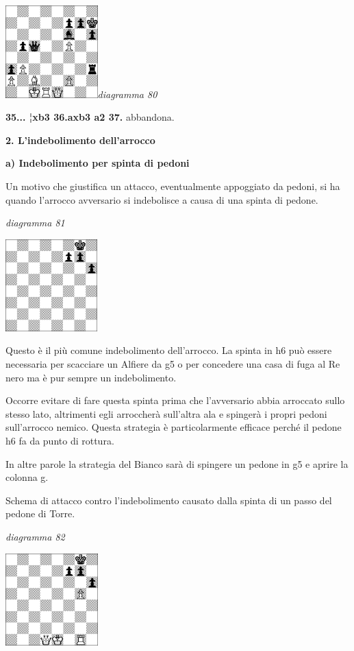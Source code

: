 \documentclass[
]{article}
\begin{document}
\includegraphics[width=1.40139in,height=1.40139in]{vertopal_109f12be458a423d8f3cc838880eaea2/media/image80.png}\emph{diagramma
80}

\textbf{35... ¦xb3 36.axb3 a2 37.} abbandona.

\textbf{2. L'indebolimento dell'arrocco}

\textbf{a) Indebolimento per spinta di pedoni}

Un motivo che giustifica un attacco, eventualmente appoggiato da pedoni,
si ha quando l'arrocco avversario si indebolisce a causa di una spinta
di pedone.

\emph{diagramma 81}

\includegraphics[width=1.39792in,height=1.39792in]{vertopal_109f12be458a423d8f3cc838880eaea2/media/image81.png}

Questo è il più comune indebolimento dell'arrocco. La spinta in h6 può
essere necessaria per scacciare un Alfiere da g5 o per concedere una
casa di fuga al Re nero ma è pur sempre un indebolimento.

Occorre evitare di fare questa spinta prima che l'avversario abbia
arroccato sullo stesso lato, altrimenti egli arroccherà sull'altra ala e
spingerà i propri pedoni sull'arrocco nemico. Questa strategia è
particolarmente efficace perché il pedone h6 fa da punto di rottura.

In altre parole la strategia del Bianco sarà di spingere un pedone in g5
e aprire la colonna g.

Schema di attacco contro l'indebolimento causato dalla spinta di un
passo del pedone di Torre.

\emph{diagramma 82}

\includegraphics[width=1.40139in,height=1.40139in]{vertopal_109f12be458a423d8f3cc838880eaea2/media/image82.png}
\end{document}
